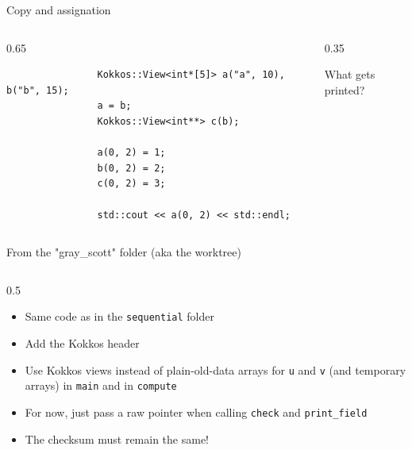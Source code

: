 \documentclass[
    aspectratio=169,
]{beamer}
\begin{document}
\begin{frame}[fragile]{Copy and assignation}
    \begin{columns}
        \begin{column}{0.65\linewidth}
            \begin{verbatim}
                Kokkos::View<int*[5]> a("a", 10), b("b", 15);
                a = b;
                Kokkos::View<int**> c(b);

                a(0, 2) = 1;
                b(0, 2) = 2;
                c(0, 2) = 3;

                std::cout << a(0, 2) << std::endl;
            \end{verbatim}
        \end{column}
        \begin{column}{0.35\linewidth}
            \begin{block}{What gets printed?}
            \end{block}
        \end{column}
    \end{columns}
\end{frame}

\begin{exerciseframe}{From the "gray\_scott" folder (aka the worktree)}
    \begin{columns}
        \begin{column}{0.5\linewidth}
            \begin{itemize}
                \item Same code as in the \texttt{sequential} folder
                \item Add the Kokkos header
                \item Use Kokkos views instead of plain-old-data arrays for \texttt{u} and \texttt{v} (and temporary arrays) in \texttt{main} and in \texttt{compute}
                \item For now, just pass a raw pointer when calling \texttt{check} and \texttt{print\_field}
                \item The checksum must remain the same!
            \end{itemize}
        \end{column}
    \end{columns}
\end{exerciseframe}
\end{document}
